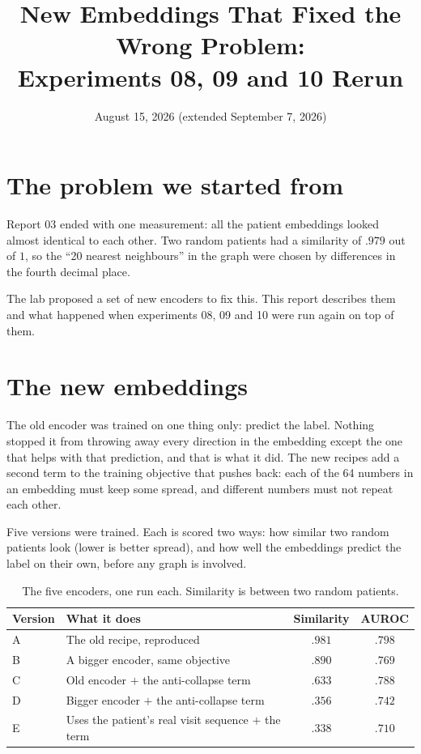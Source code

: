 \documentclass[11pt]{article}
\title{New Embeddings That Fixed the Wrong Problem:\\ Experiments 08, 09 and 10 Rerun}
\author{}
\date{August 15, 2026 \quad (extended September 7, 2026)}
\begin{document}
\maketitle

\section*{The problem we started from}

Report 03 ended with one measurement: all the patient embeddings looked almost identical to
each other. Two random patients had a similarity of $.979$ out of $1$, so the ``20 nearest
neighbours'' in the graph were chosen by differences in the fourth decimal place.

The lab proposed a set of new encoders to fix this. This report describes them and what
happened when experiments 08, 09 and 10 were run again on top of them.

\section*{The new embeddings}

The old encoder was trained on one thing only: predict the label. Nothing stopped it from
throwing away every direction in the embedding except the one that helps with that prediction,
and that is what it did. The new recipes add a second term to the training objective that
pushes back: each of the 64 numbers in an embedding must keep some spread, and different
numbers must not repeat each other.

Five versions were trained. Each is scored two ways: how similar two random patients look
(lower is better spread), and how well the embeddings predict the label on their own, before
any graph is involved.

\begin{table}[h]
\centering
\begin{tabularx}{\textwidth}{lXcc}
\toprule
Version & What it does & Similarity & AUROC \\
\midrule
A & The old recipe, reproduced & $.981$ & $.798$ \\
B & A bigger encoder, same objective & $.890$ & $.769$ \\
C & Old encoder $+$ the anti-collapse term & $\mathbf{.633}$ & $\mathbf{.788}$ \\
D & Bigger encoder $+$ the anti-collapse term & $.356$ & $.742$ \\
E & Uses the patient's real visit sequence $+$ the term & $.338$ & $.710$ \\
\bottomrule
\end{tabularx}
\caption{The five encoders, one run each. Similarity is between two random patients.}
\end{table}
\end{document}
